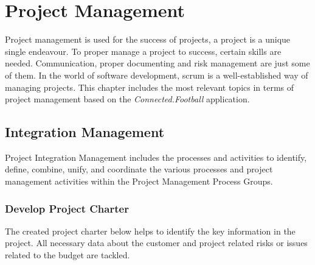 \section{Project Management}
\label{sec:project_management}

Project management is used for the success of projects, a project is a unique single endeavour. To proper manage a project to success, certain skills are needed. Communication, proper documenting and risk management are just some of them. In the world of software development, scrum is a well-established way of managing projects. This chapter includes the most relevant topics in terms of project management based on the \textit{Connected.Football} application.



\subsection{Integration Management}
\label{ssec:integration_management}

Project Integration Management includes the processes and activities to identify, define, combine, unify, and
coordinate the various processes and project management activities within the Project Management Process
Groups.
\newpage

\subsubsection{Develop Project Charter}
\label{sssec:develop_project_charter}

The created project charter below helps to identify the key information in the project.
All necessary data about the customer and project related risks or issues related to the budget are tackled.

